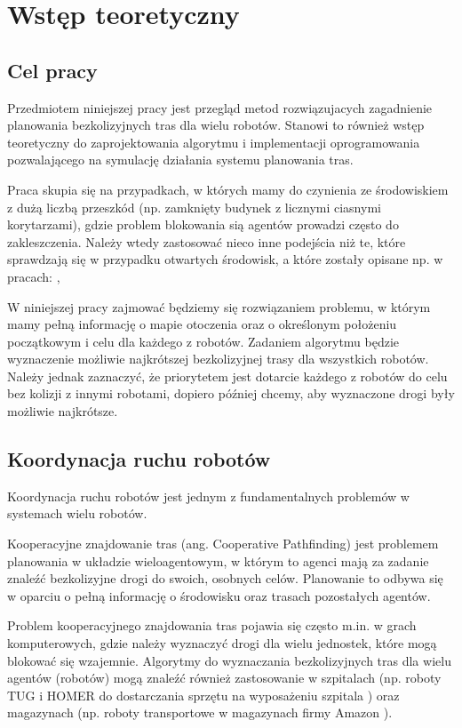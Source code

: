 \chapter{Wstęp teoretyczny}
\label{ch:wstept}

\section{Cel pracy}
Przedmiotem niniejszej pracy jest przegląd metod rozwiązujacych zagadnienie planowania bezkolizyjnych tras dla wielu robotów. Stanowi to również wstęp teoretyczny do zaprojektowania algorytmu i implementacji oprogramowania pozwalającego na symulację działania systemu planowania tras.

Praca skupia się na przypadkach, w których mamy do czynienia ze środowiskiem z dużą liczbą przeszkód (np. zamknięty budynek z licznymi ciasnymi korytarzami), gdzie problem blokowania sią agentów prowadzi często do zakleszczenia. Należy wtedy zastosować nieco inne podejścia niż te, które sprawdzają się w przypadku otwartych środowisk, a które zostały opisane np. w pracach: \cite{roszkowska}, \cite{siemiatkowska}

W niniejszej pracy zajmować będziemy się rozwiązaniem problemu, w którym mamy pełną informację o mapie otoczenia oraz o określonym położeniu początkowym i celu dla każdego z robotów. Zadaniem algorytmu będzie wyznaczenie możliwie najkrótszej bezkolizyjnej trasy dla wszystkich robotów. Należy jednak zaznaczyć, że priorytetem jest dotarcie każdego z robotów do celu bez kolizji z innymi robotami, dopiero później chcemy, aby wyznaczone drogi były możliwie najkrótsze.

\section{Koordynacja ruchu robotów}
Koordynacja ruchu robotów jest jednym z fundamentalnych problemów w systemach wielu robotów. \cite{optpriorities}

Kooperacyjne znajdowanie tras (ang. Cooperative Pathfinding) jest problemem planowania w układzie wieloagentowym, w którym to agenci mają za zadanie znaleźć bezkolizyjne drogi do swoich, osobnych celów. Planowanie to odbywa się w oparciu o pełną informację o środowisku oraz trasach pozostałych agentów. \cite{cooppath}

Problem kooperacyjnego znajdowania tras pojawia się często m.in. w grach komputerowych, gdzie należy wyznaczyć drogi dla wielu jednostek, które mogą blokować się wzajemnie. Algorytmy do wyznaczania bezkolizyjnych tras dla wielu agentów (robotów) mogą znaleźć również zastosowanie w szpitalach (np. roboty TUG i HOMER do dostarczania sprzętu na wyposażeniu szpitala \cite{tughomer}) oraz magazynach (np. roboty transportowe w magazynach firmy Amazon \cite{amazonrobots}).

